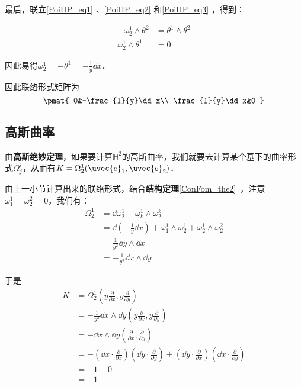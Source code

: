 最后，联立\autoref{PoiHP_eq1} 、\autoref{PoiHP_eq2} 和\autoref{PoiHP_eq3} ，得到：

\begin{equation}
\begin{aligned}
-\omega^1_2\wedge\theta^2&=\theta^1\wedge\theta^2\\
\omega^1_2\wedge\theta^1&=0
\end{aligned}
\end{equation}

因此易得$\omega^1_2=-\theta^1=-\frac{1}{y}\dd x$．

因此联络形式矩阵为
\begin{equation}
\pmat{
    0&-\frac{1}{y}\dd x\\
    \frac{1}{y}\dd x&0
}
\end{equation}

\subsection{高斯曲率}


由\textbf{高斯绝妙定理}，如果要计算$\mathbb{H}^2$的高斯曲率，我们就要去计算某个基下的曲率形式$\Omega^i_j$，从而有$K=\Omega^1_2(\uvec{e}_1, \uvec{e}_2)$．

由上一小节计算出来的联络形式，结合\textbf{结构定理}\autoref{ConFom_the2}~，注意$\omega^1_1=\omega^2_2=0$，我们有：
\begin{equation}
\begin{aligned}
\Omega^1_2&=\dd \omega^1_2+\omega^1_k\wedge\omega^k_2\\
&=\dd(-\frac{1}{y}\dd x)+\omega^1_1\wedge\omega^1_2+\omega^1_2\wedge\omega^2_2\\
&=\frac{1}{y^2}\dd y\wedge\dd x\\
&=-\frac{1}{y^2}\dd x\wedge \dd y
\end{aligned}
\end{equation}

于是
\begin{equation}
\begin{aligned}
K&=\Omega^1_2(y\frac{\partial}{\partial x}, y\frac{\partial}{\partial y})\\
&=-\frac{1}{y^2}\dd x\wedge \dd y(y\frac{\partial}{\partial x}, y\frac{\partial}{\partial y})\\
&=-\dd x\wedge \dd y(\frac{\partial}{\partial x}, \frac{\partial}{\partial y})\\
&=-(\dd x\cdot \frac{\partial}{\partial x})(\dd y\cdot \frac{\partial}{\partial y})+(\dd y\cdot \frac{\partial}{\partial x})(\dd x\cdot \frac{\partial}{\partial y})\\
&=-1+0\\
&=-1
\end{aligned}
\end{equation}

